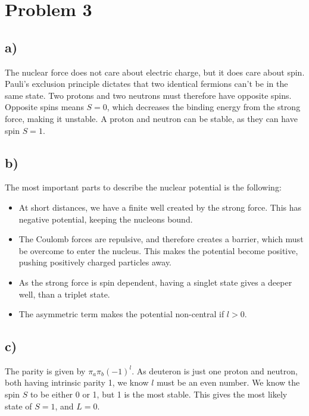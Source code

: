 \documentclass{article}
\begin{document}
\section*{Problem 3}
\subsection*{a)}
The nuclear force does not care about electric charge, but it does care about spin. Pauli's exclusion principle dictates that two identical fermions can't be in the same state. Two protons and two neutrons must therefore have opposite spins. Opposite spins means $S = 0$, which decreases the binding energy from the strong force, making it unstable. A proton and neutron can be stable, as they can have spin $S = 1$. 

\subsection*{b)}
The most important parts to describe the nuclear potential is the following:
\begin{itemize}
  \item At short distances, we have a finite well created by the strong force. This has negative potential, keeping the nucleons bound. 
  \item The Coulomb forces are repulsive, and therefore creates a barrier, which must be overcome to enter the nucleus. This makes the potential become positive, pushing positively charged particles away. 
  \item As the strong force is spin dependent, having a singlet state gives a deeper well, than a triplet state. 
  \item The asymmetric term makes the potential non-central if $l > 0$. 
\end{itemize}

\subsection*{c)}
The parity is given by $π_a π_b (-1)^{l}$. As deuteron is just one proton and neutron, both having intrinsic parity 1, we know $l$ must be an even number. We know the spin $S$ to be either 0 or 1, but 1 is the most stable. This gives the most likely state of $S = 1$, and $L = 0$. 
\end{document}
